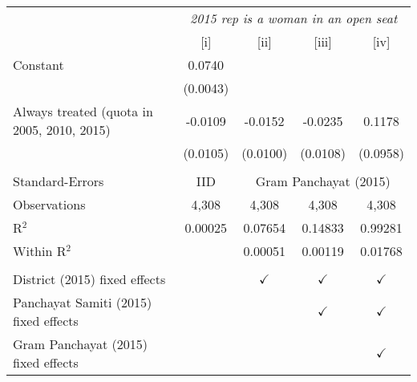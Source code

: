 
\begingroup
\centering
\begin{tabular}{lcccc}
   \toprule
    & \multicolumn{4}{c}{\textit{2015 rep is a woman in an open seat}}\\
                                              & [i]      & [ii]          & [iii]         & [iv]\\  
   \midrule 
   Constant                                   & 0.0740   &               &               &   \\   
                                              & (0.0043) &               &               &   \\   
   Always treated (quota in 2005, 2010, 2015) & -0.0109  & -0.0152       & -0.0235       & 0.1178\\   
                                              & (0.0105) & (0.0100)      & (0.0108)      & (0.0958)\\   
    \\
   Standard-Errors & IID & \multicolumn{3}{c}{Gram Panchayat (2015)} \\ 
   Observations                               & 4,308    & 4,308         & 4,308         & 4,308\\  
   R$^2$                                      & 0.00025  & 0.07654       & 0.14833       & 0.99281\\  
   Within R$^2$                               &          & 0.00051       & 0.00119       & 0.01768\\  
    \\
   District (2015) fixed effects              &          & $\checkmark$  & $\checkmark$  & $\checkmark$\\   
   Panchayat Samiti (2015) fixed effects      &          &               & $\checkmark$  & $\checkmark$\\   
   Gram Panchayat (2015) fixed effects        &          &               &               & $\checkmark$\\   
   \bottomrule
\end{tabular}
\par\endgroup


